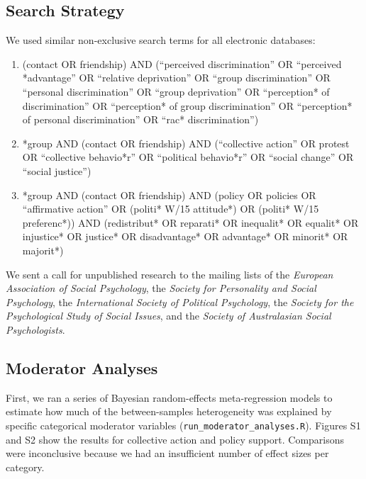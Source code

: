 \documentclass[12pt, letterpaper]{article}
\begin{document}
\hypertarget{search-strategy}{%
\subsection{Search Strategy}\label{search-strategy}}

We used similar non-exclusive search terms for all electronic databases:

\begin{enumerate}
\def\labelenumi{\arabic{enumi}.}
\item
  (contact OR friendship) AND (``perceived discrimination'' OR
  ``perceived *advantage'' OR ``relative deprivation'' OR ``group
  discrimination'' OR ``personal discrimination'' OR ``group
  deprivation'' OR ``perception* of discrimination'' OR ``perception* of
  group discrimination'' OR ``perception* of personal discrimination''
  OR ``rac* discrimination'')
\item
  *group AND (contact OR friendship) AND (``collective action'' OR
  protest OR ``collective behavio*r'' OR ``political behavio*r'' OR
  ``social change'' OR ``social justice'')
\item
  *group AND (contact OR friendship) AND (policy OR policies OR
  ``affirmative action'' OR (politi* W/15 attitude*) OR (politi* W/15
  preferenc*)) AND (redistribut* OR reparati* OR inequalit* OR equalit*
  OR injustice* OR justice* OR disadvantage* OR advantage* OR minorit*
  OR majorit*)
\end{enumerate}

\noindent We sent a call for unpublished research to the mailing lists
of the \emph{European Association of Social Psychology}, the
\emph{Society for Personality and Social Psychology}, the
\emph{International Society of Political Psychology}, the \emph{Society
for the Psychological Study of Social Issues}, and the \emph{Society of
Australasian Social Psychologists}.

\hypertarget{moderator-analyses}{%
\subsection{Moderator Analyses}\label{moderator-analyses}}

First, we ran a series of Bayesian random-effects meta-regression models
to estimate how much of the between-samples heterogeneity was explained
by specific categorical moderator variables
(\texttt{run\_moderator\_analyses.R}). Figures S1 and S2 show the
results for collective action and policy support. Comparisons were
inconclusive because we had an insufficient number of effect sizes per
category.
\end{document}
